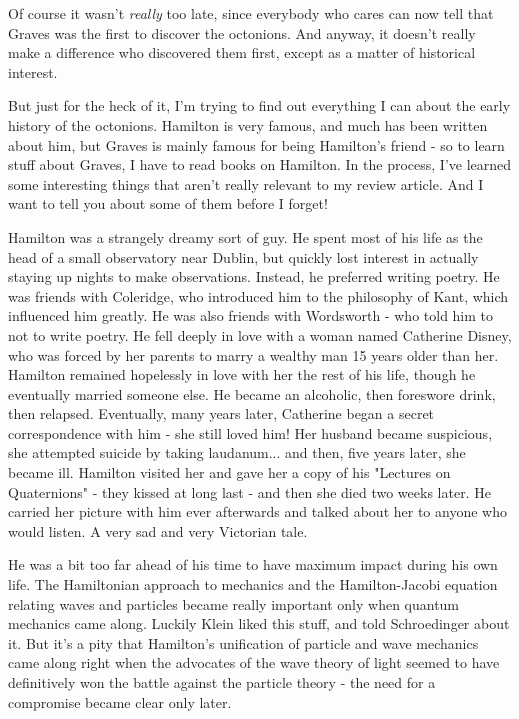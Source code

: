 Of course it wasn't \emph{really} too late, since everybody who cares 
can now tell that Graves was the first to discover the octonions.  
And anyway, it doesn't really make a difference who discovered them 
first, except as a matter of historical interest.  

But just for the heck of it, I'm trying to find out everything I can 
about the early history of the octonions.  Hamilton is very famous, and 
much has been written about him, but Graves is mainly famous for being 
Hamilton's friend - so to learn stuff about Graves, I have to read books 
on Hamilton.   In the process, I've learned some interesting things that 
aren't really relevant to my review article.  And I want to tell you about 
some of them before I forget! 

Hamilton was a strangely dreamy sort of guy.  He spent most of his
life as the head of a small observatory near Dublin, but quickly lost
interest in actually staying up nights to make observations.  Instead,
he preferred writing poetry.  He was friends with Coleridge, who 
introduced him to the philosophy of Kant, which influenced him greatly.
He was also friends with Wordsworth - who told him to not to write poetry.  
He fell deeply in love with a woman named Catherine Disney, who was forced 
by her parents to marry a wealthy man 15 years older than her.  Hamilton
remained hopelessly in love with her the rest of his life, though he 
eventually married someone else.  He became an alcoholic, then foreswore 
drink, then relapsed.  Eventually, many years later, Catherine began a 
secret correspondence with him - she still loved him!  Her husband became 
suspicious, she attempted suicide by taking laudanum... and then, five 
years later, she became ill.   Hamilton visited her and gave her a copy of 
his "Lectures on Quaternions" - they kissed at long last - and 
then she died two weeks later.  He carried her picture with him ever 
afterwards and talked about her to anyone who would listen.   A very 
sad and very Victorian tale.  

He was a bit too far ahead of his time to have maximum impact during his 
own life.  The Hamiltonian approach to mechanics and the Hamilton-Jacobi 
equation relating waves and particles became really important only when 
quantum mechanics came along.  Luckily Klein liked this stuff, and told 
Schroedinger about it.  But it's a pity that Hamilton's unification of 
particle and wave mechanics came along right when the advocates of the
wave theory of light seemed to have definitively won the battle against 
the particle theory - the need for a compromise became clear only later.  

